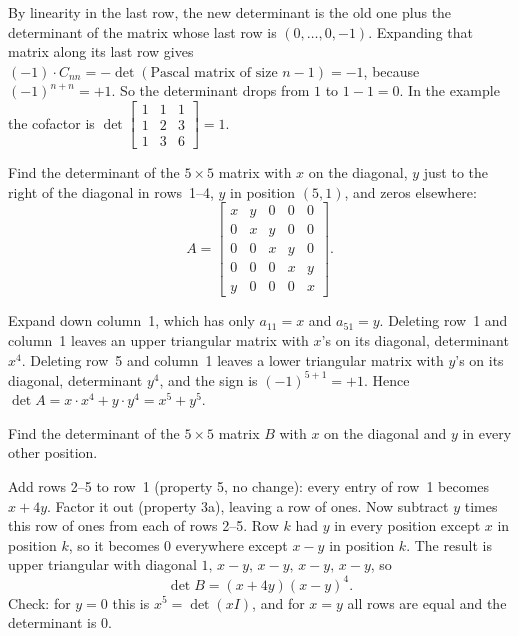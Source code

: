 \begin{solution}
By linearity in the last row, the new determinant is the old one plus the determinant of the
matrix whose last row is $(0,\dots,0,-1)$. Expanding that matrix along its last row gives
$(-1)\cdot C_{nn}=-\det(\text{Pascal matrix of size }n-1)=-1$, because $(-1)^{n+n}=+1$. So the
determinant drops from $1$ to $1-1=0$. In the example the cofactor is
$\det\left[\begin{smallmatrix}1&1&1\\1&2&3\\1&3&6\end{smallmatrix}\right]=1$.
\end{solution}

\begin{exercise}\label{ex:u21-cyclic5}
Find the determinant of the $5\times 5$ matrix with $x$ on the diagonal, $y$ just to the
right of the diagonal in rows~1--4, $y$ in position $(5,1)$, and zeros elsewhere:
\[
  A=\begin{bmatrix}x&y&0&0&0\\0&x&y&0&0\\0&0&x&y&0\\0&0&0&x&y\\y&0&0&0&x\end{bmatrix}.
\]
\end{exercise}

\begin{solution}
Expand down column~1, which has only $a_{11}=x$ and $a_{51}=y$. Deleting row~1 and column~1
leaves an upper triangular matrix with $x$'s on its diagonal, determinant $x^4$. Deleting
row~5 and column~1 leaves a lower triangular matrix with $y$'s on its diagonal, determinant
$y^4$, and the sign is $(-1)^{5+1}=+1$. Hence $\det A=x\cdot x^4+y\cdot y^4=x^5+y^5$.
\end{solution}

\begin{exercise}\label{ex:u21-allY}
Find the determinant of the $5\times 5$ matrix $B$ with $x$ on the diagonal and $y$ in every
other position.
\end{exercise}

\begin{solution}
Add rows 2--5 to row~1 (property 5, no change): every entry of row~1 becomes $x+4y$. Factor
it out (property 3a), leaving a row of ones. Now subtract $y$ times this row of ones from each of
rows 2--5. Row $k$ had $y$ in every position except $x$ in position $k$, so it becomes $0$
everywhere except $x-y$ in position $k$. The result is upper
triangular with diagonal $1,\,x-y,\,x-y,\,x-y,\,x-y$, so
\[
  \det B=(x+4y)(x-y)^4 .
\]
Check: for $y=0$ this is $x^5=\det(xI)$, and for $x=y$ all rows are equal and the determinant
is $0$.
\end{solution}
